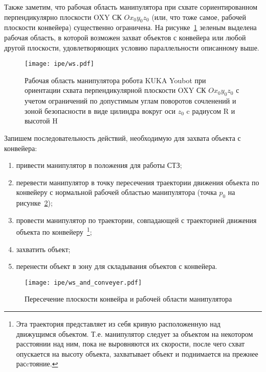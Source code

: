 Также заметим, что рабочая область манипулятора при схвате сориентированном перпендикулярно плоскости OXY СК $ Ox_{0}y_{0}z_{0} $ (или, что тоже самое, рабочей плоскости конвейера) существенно ограничена. На рисунке~\ref{img:work_space_noraml} зеленым выделена рабочая область, в которой возможен захват объектов с конвейера или любой другой плоскости, удовлетворяющих условию параллельности описанному выше.


\begin{figure}[h!]
	\centering\texttt{[image: ipe/ws.pdf]}
	\vspace{0.5cm}
	\caption{Рабочая область манипулятора робота KUKA Youbot при ориентации схвата перпендикулярной плоскости OXY СК $ Ox_{0}y_{0}z_{0} $ с учетом ограничений по допустимым углам поворотов сочленений и зоной безопасности в виде цилиндра вокруг оси $ z_0 $ c радиусом R и высотой H}
	\label{img:work_space_noraml}
\end{figure}

Запишем последовательность действий, необходимую для захвата объекта с конвейера:
\begin{enumerate}
	\item привести манипулятор в положения для работы СТЗ;
	\item перевести манипулятор в точку пересечения траектории движения объекта по конвейеру с нормальной рабочей областью манипулятора (точка $ p_0 $ на рисунке~\ref{img:ws_and_conveyer.pdf});
	\item провести манипулятор по траектории, совпадающей с траекторией движения объекта по конвейеру~\footnote{Эта траектория представляет из себя кривую расположенную над движущимся объектом. Т.е. манипулятор следует за объектом на некотором расстоянии над ним, пока не выровняются их скорости, после чего схват опускается на высоту объекта, захватывает объект и поднимается на прежнее расcтояние.};
	\item захватить объект;
	\item перенести объект в зону для складывания объектов с конвейера.
\end{enumerate}

\begin{figure}[h!]
	\centering\texttt{[image: ipe/ws\_and\_conveyer.pdf]}
	\vspace{0.5cm}
	\caption{Пересечение плоскости конвейра и рабочей области манипулятора}
	\label{img:ws_and_conveyer.pdf}
\end{figure}


